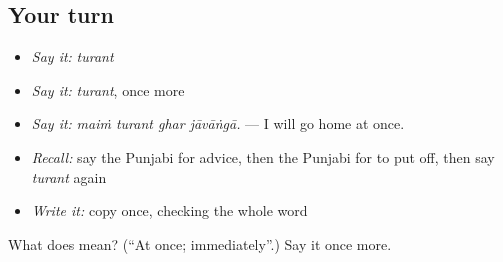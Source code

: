 \subsection*{Your turn}
\begin{itemize}
\raggedright
  \item \emph{Say it:} \emph{turant}
  \item \emph{Say it:} \emph{turant}, once more
  \item \emph{Say it:} \emph{maiṁ turant ghar jāvāṅgā.} — I will go home at once.
  \item \emph{Recall:} say the Punjabi for advice, then the Punjabi for to put off, then say \emph{turant} again
  \item \emph{Write it:} copy \textbf{} once, checking the whole word
\end{itemize}

\begin{tcolorbox}[breakable,colback=teal!4,colframe=teal!35!black,title={Before you move on}]
What does  mean? (\textquotedblleft{}At once; immediately\textquotedblright{}.) Say it once more.
\end{tcolorbox}
